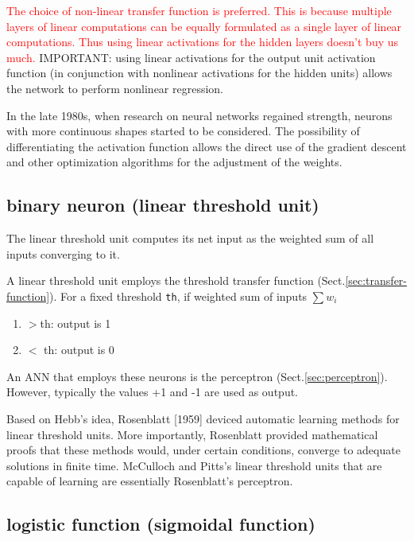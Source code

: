 \textcolor{red}{The choice of non-linear transfer function is preferred. This is
because multiple layers of linear computations can be equally formulated as a
single layer of linear computations. Thus using linear activations for the
hidden layers doesn't buy us much.} IMPORTANT: using linear activations for the
output unit activation function (in conjunction with nonlinear activations for
the hidden units) allows the network to perform nonlinear regression.


In the late 1980s, when research on neural networks regained strength, neurons
with more continuous shapes started to be considered. The possibility of
differentiating the activation function allows the direct use of the gradient
descent and other optimization algorithms for the adjustment of the weights.

\subsection{binary neuron (linear threshold unit)}
\label{sec:binary-neuron}
\label{sec:linear-threshold-unit}
\label{sec:Heavyside-step-function}

The linear threshold unit computes its net input as the weighted sum of all
inputs converging to it. 

A linear threshold unit employs the threshold transfer function
(Sect.\ref{sec:transfer-function}). For a fixed threshold \verb!th!, if weighted
sum of inputs $\sum w_i$
\begin{enumerate}
  \item $> $th: output is 1
  \item $<$ th: output is 0
\end{enumerate}

An ANN that employs these neurons is the perceptron (Sect.\ref{sec:perceptron}).
However, typically the values +1 and -1 are used as output.

Based on Hebb's idea, Rosenblatt [1959] deviced automatic learning methods for
linear threshold units. More importantly, Rosenblatt provided mathematical
proofs that these methods would, under certain conditions, converge to adequate
solutions in finite time. McCulloch and Pitts's linear threshold units that are
capable of learning are essentially Rosenblatt's perceptron.

\subsection{logistic function (sigmoidal function)}

